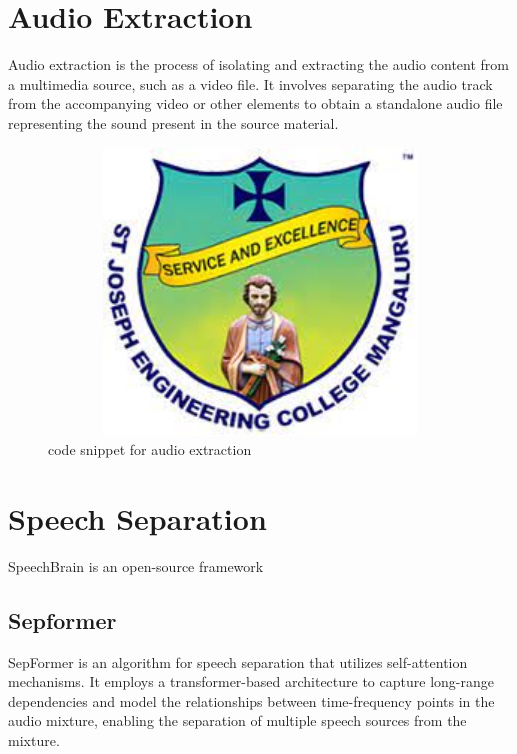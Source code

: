 \documentclass[12pt,a4paper]{report}
\begin{document}
\section{Audio Extraction}
\par
Audio extraction is the process of isolating and extracting the audio content from a multimedia source, such as a video file. It involves separating the audio track from the accompanying video or other elements to obtain a standalone audio file representing the sound present in the source material.

\begin{figure}[hbtp]
\centering
\includegraphics[width=5in,height=3in]{./pic/sjeclogo.png}
\caption{code snippet for audio extraction}
\end{figure}

\section{Speech Separation}
\par SpeechBrain is an open-source framework 

\subsection{Sepformer}
\par SepFormer is an algorithm for speech separation that utilizes self-attention mechanisms. It employs a transformer-based architecture to capture long-range dependencies and model the relationships between time-frequency points in the audio mixture, enabling the separation of multiple speech sources from the mixture.
\end{document}

